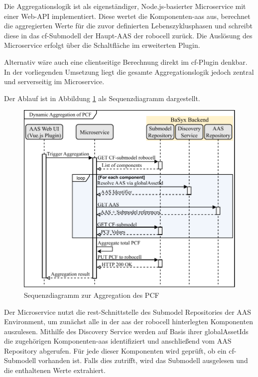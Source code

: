 Die Aggregationslogik ist als eigenständiger, Node.js-basierter Microservice mit einer Web-API implementiert. 
Diese wertet die Komponenten-\acs{aas} aus, berechnet die aggregierten Werte für die zuvor definierten Lebenszyklusphasen und schreibt diese in das \acs{cf}-Submodell der Haupt-AAS der robocell zurück. 
Die Auslösung des Microservice erfolgt über die Schaltfläche im erweiterten Plugin.

Alternativ wäre auch eine clientseitige Berechnung direkt im \acs{cf}-Plugin denkbar. 
In der vorliegenden Umsetzung liegt die gesamte Aggregationslogik jedoch zentral und serverseitig im Microservice. 


Der Ablauf ist in Abbildung \ref{fig:SequenzdiagrammPCF} als Sequenzdiagramm dargestellt.

\newpage
\begin{figure}[htbp]
    \centering
        \includegraphics[width=1\textwidth]{Bilder/DPP/PCF_Aggregation_SmallLine.pdf}
    
    \caption{Sequenzdiagramm zur Aggregation des PCF}
    \label{fig:SequenzdiagrammPCF}
\end{figure}

Der Microservice nutzt die \acs{rest}-Schnittstelle des Submodel Repositories der AAS Environment, um zunächst alle in der \acs{aas} der robocell hinterlegten Komponenten auszulesen. 
Mithilfe des Discovery Service werden auf Basis ihrer globalAssetIds die zugehörigen Komponenten-\acs{aas} identifiziert und anschließend vom AAS Repository abgerufen.
Für jede dieser Komponenten wird geprüft, ob ein \acs{cf}-Submodell vorhanden ist. 
Falls dies zutrifft, wird das Submodell ausgelesen und die enthaltenen Werte extrahiert.

